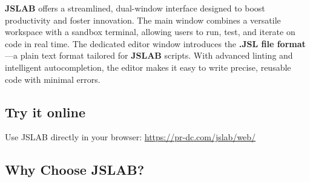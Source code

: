 \documentclass[12pt,a4paper]{article}
\begin{document}
\textbf{JSLAB} offers a streamlined, dual-window interface designed to boost productivity and foster innovation. The main window combines a versatile workspace with a sandbox terminal, allowing users to run, test, and iterate on code in real time. The dedicated editor window introduces the \textbf{.JSL file format}—a plain text format tailored for \textbf{JSLAB} scripts. With advanced linting and intelligent autocompletion, the editor makes it easy to write precise, reusable code with minimal errors.

\subsection{Try it online}

Use JSLAB directly in your browser: \href{https://pr-dc.com/jslab/web/}{https://pr-dc.com/jslab/web/}

\subsection{Why Choose JSLAB?}
\end{document}
